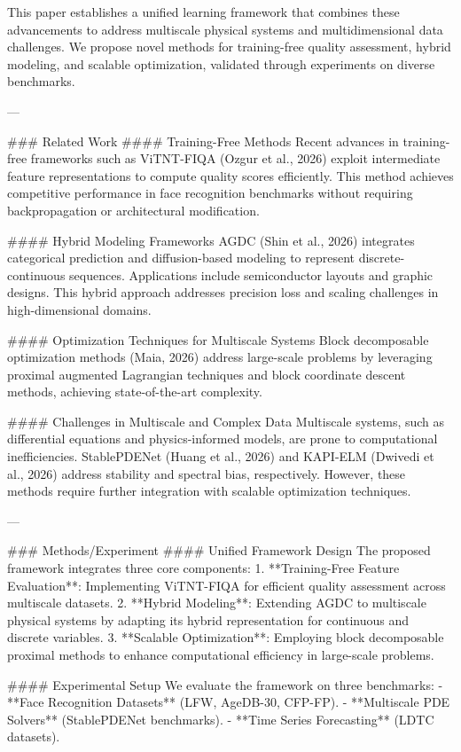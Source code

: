 This paper establishes a unified learning framework that combines these advancements to address multiscale physical systems and multidimensional data challenges. We propose novel methods for training-free quality assessment, hybrid modeling, and scalable optimization, validated through experiments on diverse benchmarks.

---

### Related Work  
#### Training-Free Methods  
Recent advances in training-free frameworks such as ViTNT-FIQA (Ozgur et al., 2026) exploit intermediate feature representations to compute quality scores efficiently. This method achieves competitive performance in face recognition benchmarks without requiring backpropagation or architectural modification.  

#### Hybrid Modeling Frameworks  
AGDC (Shin et al., 2026) integrates categorical prediction and diffusion-based modeling to represent discrete-continuous sequences. Applications include semiconductor layouts and graphic designs. This hybrid approach addresses precision loss and scaling challenges in high-dimensional domains.  

#### Optimization Techniques for Multiscale Systems  
Block decomposable optimization methods (Maia, 2026) address large-scale problems by leveraging proximal augmented Lagrangian techniques and block coordinate descent methods, achieving state-of-the-art complexity.  

#### Challenges in Multiscale and Complex Data  
Multiscale systems, such as differential equations and physics-informed models, are prone to computational inefficiencies. StablePDENet (Huang et al., 2026) and KAPI-ELM (Dwivedi et al., 2026) address stability and spectral bias, respectively. However, these methods require further integration with scalable optimization techniques.  

---

### Methods/Experiment  
#### Unified Framework Design  
The proposed framework integrates three core components:  
1. **Training-Free Feature Evaluation**: Implementing ViTNT-FIQA for efficient quality assessment across multiscale datasets.  
2. **Hybrid Modeling**: Extending AGDC to multiscale physical systems by adapting its hybrid representation for continuous and discrete variables.  
3. **Scalable Optimization**: Employing block decomposable proximal methods to enhance computational efficiency in large-scale problems.  

#### Experimental Setup  
We evaluate the framework on three benchmarks:  
- **Face Recognition Datasets** (LFW, AgeDB-30, CFP-FP).  
- **Multiscale PDE Solvers** (StablePDENet benchmarks).  
- **Time Series Forecasting** (LDTC datasets).  

